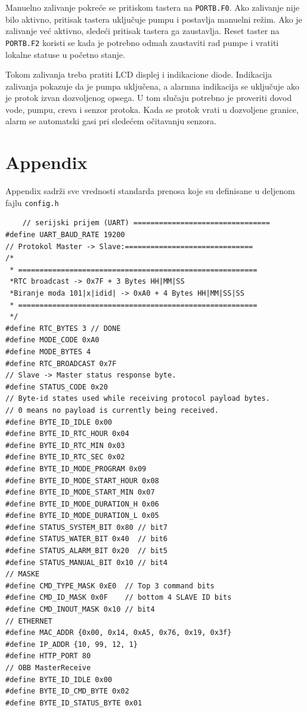 \documentclass[12pt]{article}
\numberwithin{figure}{section}
\begin{document}
  Manuelno zalivanje pokreće se pritiskom tastera na \texttt{PORTB.F0}. 
  Ako zalivanje nije bilo aktivno, pritisak tastera uključuje pumpu i postavlja manuelni režim. 
  Ako je zalivanje već aktivno, sledeći pritisak tastera ga zaustavlja. 
  Reset taster na \texttt{PORTB.F2} koristi se kada je potrebno odmah zaustaviti rad pumpe i vratiti lokalne statuse u početno stanje.

  Tokom zalivanja treba pratiti LCD displej i indikacione diode. 
  Indikacija zalivanja pokazuje da je pumpa uključena, a alarmna indikacija se uključuje ako je protok izvan dozvoljenog opsega. 
  U tom slučaju potrebno je proveriti dovod vode, pumpu, creva i senzor protoka. 
  Kada se protok vrati u dozvoljene granice, alarm se automatski gasi pri sledećem očitavanju senzora.
  
  \clearpage
  \section{Appendix}
  Appendix sadrži sve vrednosti standarda prenosa koje su definisane u deljenom fajlu \texttt{config.h} \newline
  \begin{verbatim}
    // serijski prijem (UART) ================================
#define UART_BAUD_RATE 19200
// Protokol Master -> Slave:==============================
/*
 * ========================================================
 *RTC broadcast -> 0x7F + 3 Bytes HH|MM|SS
 *Biranje moda 101|x|idid| -> 0xA0 + 4 Bytes HH|MM|SS|SS
 * ========================================================
 */
#define RTC_BYTES 3 // DONE
#define MODE_CODE 0xA0
#define MODE_BYTES 4
#define RTC_BROADCAST 0x7F
// Slave -> Master status response byte.
#define STATUS_CODE 0x20
// Byte-id states used while receiving protocol payload bytes.
// 0 means no payload is currently being received.
#define BYTE_ID_IDLE 0x00
#define BYTE_ID_RTC_HOUR 0x04
#define BYTE_ID_RTC_MIN 0x03
#define BYTE_ID_RTC_SEC 0x02
#define BYTE_ID_MODE_PROGRAM 0x09
#define BYTE_ID_MODE_START_HOUR 0x08
#define BYTE_ID_MODE_START_MIN 0x07
#define BYTE_ID_MODE_DURATION_H 0x06
#define BYTE_ID_MODE_DURATION_L 0x05
#define STATUS_SYSTEM_BIT 0x80 // bit7
#define STATUS_WATER_BIT 0x40  // bit6
#define STATUS_ALARM_BIT 0x20  // bit5
#define STATUS_MANUAL_BIT 0x10 // bit4
// MASKE
#define CMD_TYPE_MASK 0xE0  // Top 3 command bits
#define CMD_ID_MASK 0x0F    // bottom 4 SLAVE ID bits
#define CMD_INOUT_MASK 0x10 // bit4
// ETHERNET
#define MAC_ADDR {0x00, 0x14, 0xA5, 0x76, 0x19, 0x3f}
#define IP_ADDR {10, 99, 12, 1}
#define HTTP_PORT 80
// OBB MasterReceive
#define BYTE_ID_IDLE 0x00
#define BYTE_ID_CMD_BYTE 0x02
#define BYTE_ID_STATUS_BYTE 0x01

  \end{verbatim}
\end{document}
